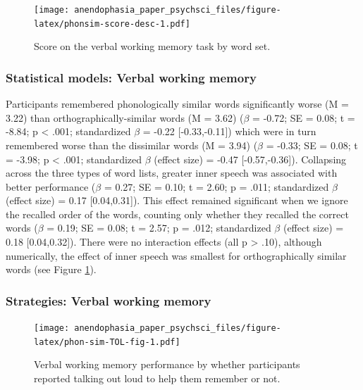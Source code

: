 \documentclass[
  man,a4paper,floatsintext]{apa6}
\begin{document}
\begin{figure}
\centering
\texttt{[image: anendophasia\_paper\_psychsci\_files/figure-latex/phonsim-score-desc-1.pdf]}
\caption{\label{fig:phonsim-score-desc}Score on the verbal working memory task by word set.}
\end{figure}

\hypertarget{statistical-models-verbal-working-memory}{%
\subsubsection{Statistical models: Verbal working memory}\label{statistical-models-verbal-working-memory}}

Participants remembered phonologically similar words significantly worse (M = 3.22) than orthographically-similar words (M = 3.62) (\(\beta\) = -0.72; SE = 0.08; t = -8.84; p \textless{} .001; standardized \(\beta\) = -0.22 {[}-0.33,-0.11{]}) which were in turn remembered worse than the dissimilar words (M = 3.94) (\(\beta\) = -0.33; SE = 0.08; t = -3.98; p \textless{} .001; standardized \(\beta\) (effect size) = -0.47 {[}-0.57,-0.36{]}). Collapsing across the three types of word lists, greater inner speech was associated with better performance (\(\beta\) = 0.27; SE = 0.10; t = 2.60; p = .011; standardized \(\beta\) (effect size) = 0.17 {[}0.04,0.31{]}). This effect remained significant when we ignore the recalled order of the words, counting only whether they recalled the correct words (\(\beta\) = 0.19; SE = 0.08; t = 2.57; p = .012; standardized \(\beta\) (effect size) = 0.18 {[}0.04,0.32{]}). There were no interaction effects (all p \textgreater{} .10), although numerically, the effect of inner speech was smallest for orthographically similar words (see Figure \ref{fig:phonsim-score-desc}).

\hypertarget{strategies-verbal-working-memory}{%
\subsubsection{Strategies: Verbal working memory}\label{strategies-verbal-working-memory}}

\begin{figure}
\centering
\texttt{[image: anendophasia\_paper\_psychsci\_files/figure-latex/phon-sim-TOL-fig-1.pdf]}
\caption{\label{fig:phon-sim-TOL-fig}Verbal working memory performance by whether participants reported talking out loud to help them remember or not.}
\end{figure}
\end{document}

